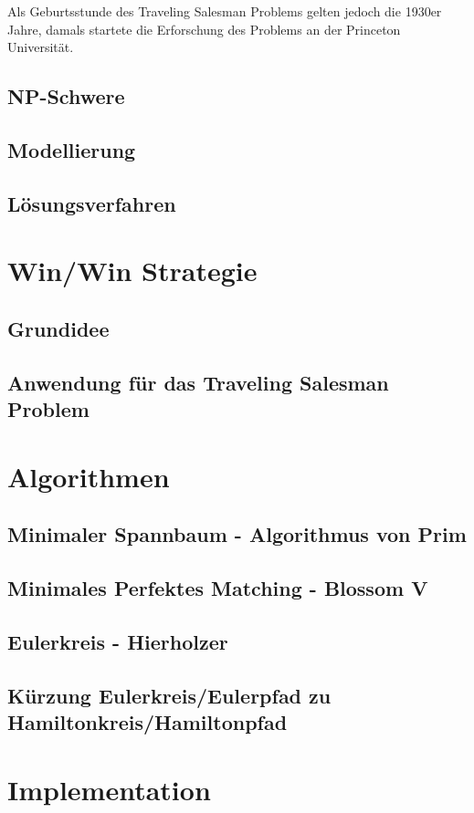 \documentclass[a4paper]{article}
\begin{document}
\medskip

Als Geburtsstunde des Traveling Salesman Problems gelten jedoch die 1930er Jahre, damals startete die Erforschung des Problems an der Princeton Universität.

\subsection{NP-Schwere}
\subsection{Modellierung}
\subsection{Lösungsverfahren}
\newpage
\section{Win/Win Strategie}
\subsection{Grundidee}
\subsection{Anwendung für das Traveling Salesman Problem}
\newpage
\section{Algorithmen}
\subsection{Minimaler Spannbaum - Algorithmus von Prim}
\subsection{Minimales Perfektes Matching - Blossom V}
\subsection{Eulerkreis - Hierholzer}
\subsection{Kürzung Eulerkreis/Eulerpfad zu Hamiltonkreis/Hamiltonpfad}
\newpage
\section{Implementation}
\end{document}
